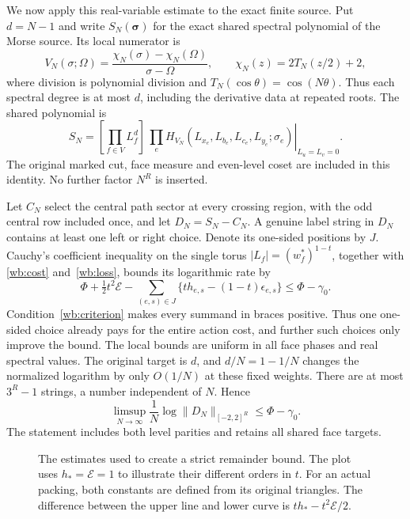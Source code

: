 We now apply this real-variable estimate to the exact finite source.
Put $d=N-1$ and write $S_N(\boldsymbol\sigma)$ for the exact shared
spectral polynomial of the Morse source. Its local numerator is
\[
 V_N(\sigma;\Omega)=
 \frac{\chi_N(\sigma)-\chi_N(\Omega)}{\sigma-\Omega},
 \qquad \chi_N(z)=2T_N(z/2)+2,
\]
where division is polynomial division and
$T_N(\cos\theta)=\cos(N\theta)$. Thus each spectral degree is at
most $d$, including the derivative data at repeated roots.
The shared polynomial is
\[
 S_N=[\prod_{f\in V}L_f^d]\,
       \left.\prod_eH_{V_N}
        (L_{x_e},L_{b_e},L_{c_e},L_{y_e};\sigma_e)
       \right|_{L_u=L_v=0}.
\]
The original marked cut, face measure and even-level coset are included
in this identity. No further factor $N^R$ is inserted.

Let $C_N$ select the central path sector at every crossing region,
with the odd central row included once, and let $D_N=S_N-C_N$.
A genuine label string in $D_N$ contains at least one left or right
choice. Denote its one-sided positions by $J$. Cauchy's coefficient
inequality on the single torus $|L_f|=(w_f^*)^{1-t}$, together with
\eqref{wb:cost} and~\eqref{wb:loss}, bounds its logarithmic rate by
\[
 \Phi+\tfrac12t^2\mathcal E
    -\sum_{(e,s)\in J}
                  \{t h_{e,s}-(1-t)\epsilon_{e,s}\}
 \le\Phi-\gamma_0.
\]
Condition~\eqref{wb:criterion} makes every summand in braces
positive. Thus one one-sided choice already pays for the entire action
cost, and further such choices only improve the bound. The local
bounds are uniform in all face phases and real spectral values.
The original target is $d$, and $d/N=1-1/N$ changes the normalized
logarithm by only $O(1/N)$ at these fixed weights. There are at most
$3^R-1$ strings, a number independent of $N$. Hence
\begin{equation}\label{wb:remainder}
 \limsup_{N\to\infty}\frac1N
         \log\|D_N\|_{[-2,2]^R}\le\Phi-\gamma_0.
\end{equation}
The statement includes both level parities and retains all shared
face targets.

\begin{figure}[ht]
\centering

\caption{The estimates used to create a strict remainder bound. The plot
uses $h_*=\mathcal E=1$ to illustrate their different orders in $t$.
For an actual packing, both constants are defined from its original
triangles. The difference between the upper line and lower curve is
$t h_*-t^2\mathcal E/2$.}\label{fig:weak-balance-gain}
\end{figure}

